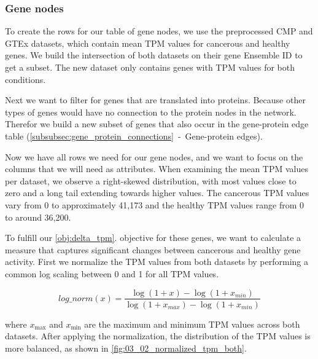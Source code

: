 \subsubsection*{Gene nodes} \label{subsubsec:gene_nodes}

To create the rows for our table of gene nodes, we use the preprocessed CMP and GTEx datasets,
which contain mean TPM values for cancerous and healthy genes.
We build the intersection of both datasets on their gene Ensemble ID to get a subset.
The new dataset only contains genes with TPM values for both conditions.

Next we want to filter for genes that are translated into proteins.
Because other types of genes would have no connection to the protein nodes in the network.
Therefor we build a new subset of genes that also occur in the gene-protein edge table
(\cref{subsubsec:gene_protein_connections}~-~Gene-protein edges).

Now we have all rows we need for our gene nodes, and we want to focus on the columns that we will need as attributes.
When examining the mean TPM values per dataset, we observe a right-skewed distribution, with most values close to zero
and a long tail extending towards higher values.
The cancerous TPM values vary from 0 to approximately 41,173 and the healthy TPM values range from 0 to around 36,200.

To fulfill our \ref{obj:delta_tpm}. objective for these genes,
we want to calculate a measure that captures significant changes between cancerous and healthy gene activity.
First we normalize the TPM values from both datasets by performing a common log scaling between 0 and 1 for all TPM values.

\begin{equation}
\label{eq:tpm_normalization}
log\_norm(x) = \frac{\log(1 + x) - \log(1 + x_{min})}{\log(1 + x_{max}) - \log(1 + x_{min})}
\end{equation}

where $x_{\max}$ and $x_{\min}$ are the maximum and minimum TPM values across both datasets.
After applying the normalization, the distribution of the TPM values is more balanced, as shown in \cref{fig:03_02_normalized_tpm_both}.

